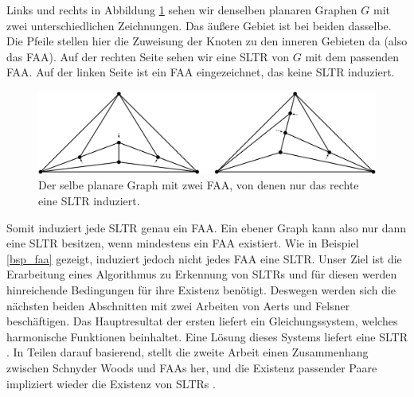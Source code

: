 \begin{example}\label{bsp_faa}
Links und rechts in Abbildung \ref{exp_faa} sehen wir denselben planaren Graphen $G$ mit zwei unterschiedlichen Zeichnungen. Das äußere Gebiet ist bei beiden dasselbe. Die Pfeile stellen hier die Zuweisung der Knoten zu den inneren Gebieten da (also das FAA). Auf der rechten Seite sehen wir eine SLTR von $G$ mit dem passenden FAA. Auf der linken Seite ist ein FAA eingezeichnet, das keine SLTR induziert.

\begin{figure}[h]
	\centering
  \includegraphics[width=1\textwidth]{faa_def.png}
  \caption{Der selbe planare Graph mit zwei FAA, von denen nur das rechte eine SLTR induziert.}
  \label{exp_faa}
\end{figure}
\end{example}

Somit induziert jede SLTR genau ein FAA. Ein ebener Graph kann also nur dann eine SLTR besitzen, wenn mindestens ein FAA existiert. Wie in Beispiel \ref{bsp_faa} gezeigt, induziert jedoch nicht jedes FAA eine SLTR. Unser Ziel ist die Erarbeitung eines Algorithmus zu Erkennung von SLTRs und für diesen werden hinreichende Bedingungen für ihre Existenz benötigt. Deswegen werden sich die nächsten beiden Abschnitten mit zwei Arbeiten von Aerts und Felsner beschäftigen. Das Hauptresultat der ersten liefert ein Gleichungssystem, welches harmonische Funktionen beinhaltet. Eine Lösung dieses Systems liefert eine SLTR \cite{af13}. In Teilen darauf basierend, stellt die zweite Arbeit einen Zusammenhang zwischen Schnyder Woods und FAAs her, und die Existenz passender Paare impliziert wieder die Existenz von SLTRs \cite{af15}.



